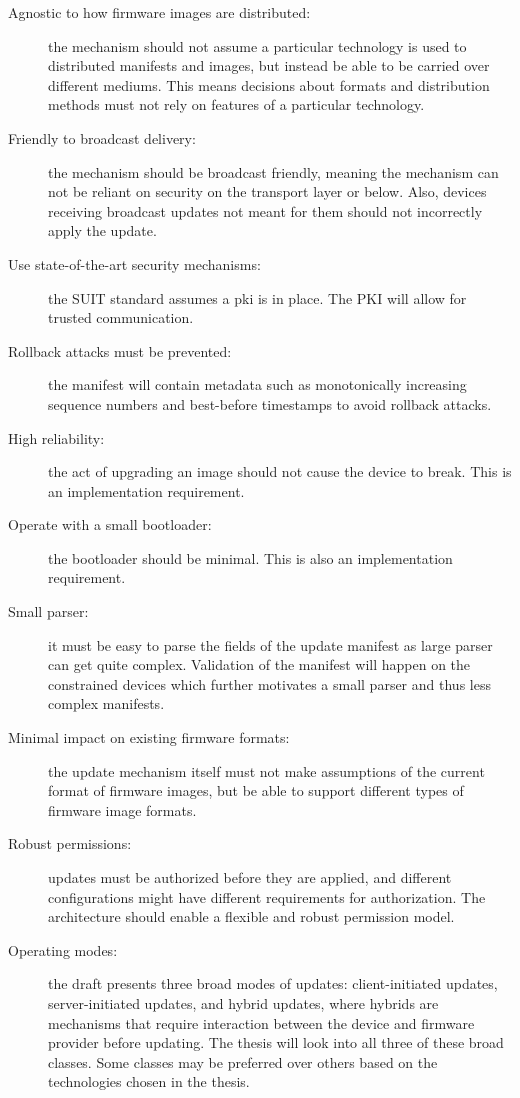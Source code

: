 \documentclass[0-thesis.tex]{subfiles}
\begin{document}
\begin{description}
    \item [Agnostic to how firmware images are distributed:]
            the mechanism should not assume a particular technology is used to distributed
            manifests and images, but instead be able to be carried over different
            mediums. This means decisions about formats and distribution methods must not
            rely on features of a particular technology.
    \item [Friendly to broadcast delivery:]
            the mechanism should be broadcast friendly, meaning the mechanism can not be
            reliant on security on the transport layer or below. Also, devices receiving
            broadcast updates not meant for them should not incorrectly apply the update.
    \item [Use state-of-the-art security mechanisms:]
            the SUIT standard assumes a \gls{pki} is in place. The PKI will allow for
            trusted communication.
    \item [Rollback attacks must be prevented:]
            the manifest will contain metadata such as monotonically increasing sequence
            numbers and best-before timestamps to avoid rollback attacks.
    \item [High reliability:]
            the act of upgrading an image should not cause the device to break. This is an
            implementation requirement. 
    \item [Operate with a small bootloader:]
            the bootloader should be minimal. This is also an implementation requirement. 
    \item [Small parser:]
            it must be easy to parse the fields of the update manifest as large parser can
            get quite complex. Validation of the manifest will happen on the constrained
            devices which further motivates a small parser and thus less complex
            manifests.
    \item [Minimal impact on existing firmware formats:]
            the update mechanism itself must not make assumptions of the current format of
            firmware images, but be able to support different types of firmware image
            formats.
    \item [Robust permissions:]
            updates must be authorized before they are applied, and different
            configurations might have different requirements for authorization. The
            architecture should enable a flexible and robust permission model.
    \item [Operating modes:]
            the draft presents three broad modes of updates: client-initiated updates,
            server-initiated updates, and hybrid updates, where hybrids are mechanisms
            that require interaction between the device and firmware provider before
            updating. The thesis will look into all three of these broad classes. Some
            classes may be preferred over others based on the technologies chosen in the
            thesis.
\end{description}
\end{document}

